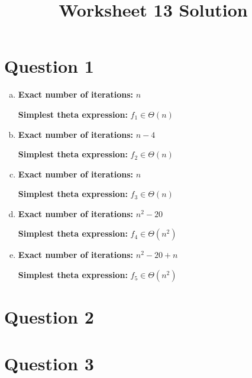 \documentclass[12pt]{article}
\begin{document}
\title{Worksheet 13 Solution}
\maketitle

\section*{Question 1}
\begin{enumerate}[a.]
    \item

    \textbf{Exact number of iterations:} $n$

    \textbf{Simplest theta expression:} $f_1 \in \Theta (n)$

    \item

    \textbf{Exact number of iterations:} $n-4$

    \textbf{Simplest theta expression:} $f_2 \in \Theta (n)$

    \item

    \textbf{Exact number of iterations:} $n$

    \textbf{Simplest theta expression:} $f_3 \in \Theta (n)$

    \item

    \textbf{Exact number of iterations:} $n^2-20$

    \textbf{Simplest theta expression:} $f_4 \in \Theta (n^2)$

    \item

    \textbf{Exact number of iterations:} $n^2-20+n$

    \textbf{Simplest theta expression:} $f_5 \in \Theta (n^2)$
\end{enumerate}

\section*{Question 2}

\section*{Question 3}
\end{document}
